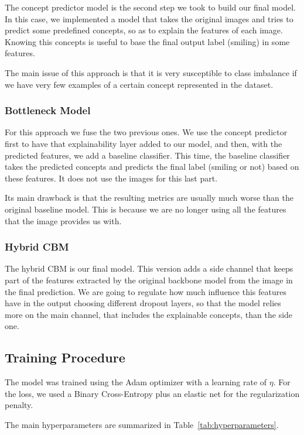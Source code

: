 \documentclass[11pt,a4paper,twocolumn]{article}
\begin{document}
The concept predictor model is the second step we took to build our final model. In this case, we implemented a model that takes the original images and tries to predict some predefined concepts, so as to explain the features of each image. Knowing this concepts is useful to base the final output label (smiling) in some features.

The main issue of this approach is that it is very susceptible to class imbalance if we have very few examples of a certain concept represented in the dataset.

\subsubsection{Bottleneck Model}

For this approach we fuse the two previous ones. We use the concept predictor first to have that explainability layer added to our model, and then, with the predicted features, we add a baseline classifier. This time, the baseline classifier takes the predicted concepts and predicts the final label (smiling or not) based on these features. It does not use the images for this last part.

Its main drawback is that the resulting metrics are usually much worse than the original baseline model. This is because we are no longer using all the features that the image provides us with.


\subsubsection{Hybrid CBM}

The hybrid CBM is our final model. This version adds a side channel that keeps part of the features extracted by the original backbone model from the image in the final prediction. We are going to regulate how much influence this features have in the output choosing different dropout layers, so that the model relies more on the main channel, that includes the explainable concepts, than the side one. 


\subsection{Training Procedure}

The model was trained using the Adam optimizer with a learning
rate of $\eta$. For the loss, we used a Binary Cross-Entropy plus an elastic net for the regularization penalty.

The main hyperparameters are summarized in
Table~\ref{tab:hyperparameters}.
\end{document}
